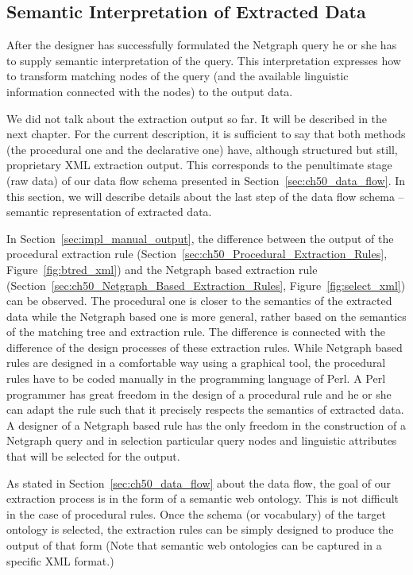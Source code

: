 \subsection{Semantic Interpretation of Extracted Data} \label{sec:ch50_sem_interpret}

After the designer has successfully formulated the Netgraph query he or she has to supply semantic interpretation of the query. This interpretation expresses how to transform matching nodes of the query (and the available linguistic information connected with the nodes) to the output data.

We did not talk about the extraction output so far. It will be described in the next chapter. For the current description, it is sufficient to say that both methods (the procedural one and the declarative one) have, although structured but still, proprietary XML extraction output. This corresponds to the penultimate stage (raw data) of our data flow schema presented in Section~\ref{sec:ch50_data_flow}. In this section, we will describe details about the last step of the data flow schema -- semantic representation of extracted data.

In Section~\ref{sec:impl_manual_output}, the difference between the output of the procedural extraction rule (Section~\ref{sec:ch50_Procedural_Extraction_Rules}, Figure~\ref{fig:btred_xml}) and the Netgraph based extraction rule (Section~\ref{sec:ch50_Netgraph_Based_Extraction_Rules}, Figure~\ref{fig:select_xml}) can be observed. The procedural one is closer to the semantics of the extracted data while the Netgraph based one is more general, rather based on the semantics of the matching tree and extraction rule. The difference is connected with the difference of the design processes of these extraction rules. While Netgraph based rules are designed in a comfortable way using a graphical tool, the procedural rules have to be coded manually in the programming language of Perl. A Perl programmer has great freedom in the design of a procedural rule and he or she can adapt the rule such that it precisely respects the semantics of extracted data. A designer of a Netgraph based rule has the only freedom in the construction of a Netgraph query and in selection particular query nodes and linguistic attributes that will be selected for the output.

As stated in Section~\ref{sec:ch50_data_flow} about the data flow, the goal of our extraction process is in the form of a semantic web ontology. This is not difficult in the case of procedural rules. Once the schema (or vocabulary) of the target ontology is selected, the extraction rules can be simply designed to produce the output of that form (Note that semantic web ontologies can be captured in a specific XML format.)

